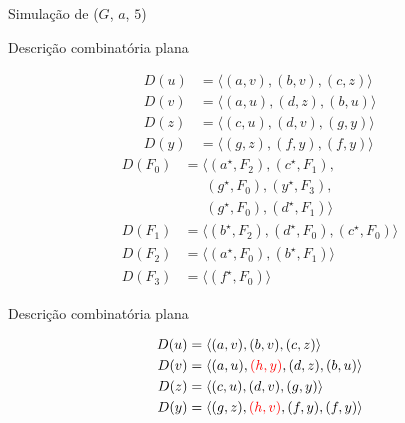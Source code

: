 \documentclass{IFES-beamer}
\newcommand{\red}{\color{red}}
\newcommand{\TODO}[1]{{{\red #1}}}
\newcommand{\AlgoName}[1]{\text{\scshape #1}}
\newcommand{\MSFupdate}{\AlgoName{mudaPesoGDP}} %
\begin{document}
\begin{frame}{Simulação de \MSFupdate($G$, $a$, $5$)}
\begin{figure}[htb]
\scalebox{1}{
\centering

}
\end{figure}
\end{frame}



\begin{frame}{Descrição combinatória plana}
\begin{minipage}[H]{0.1\textwidth}
\begin{align*}
D(u)&=\langle (a,v), (b,v), (c,z)\rangle\\
D(v)&=\langle (a,u), (d,z), (b,u)  \rangle\\
D(z)&=\langle (c,u), (d,v), (g,y) \rangle \\
D(y)&=\langle (g,z), (f,y), (f,y) \rangle
\end{align*}
\begin{align*}
D(F_0)&=\langle (a^\star, F_2), (c^\star, F_1), \\
      &~~~~~~~(g^\star, F_0), (y^\star, F_3), \\
      &~~~~~~~(g^\star, F_0), (d^\star, F_1)\rangle\\
D(F_1)&=\langle (b^\star, F_2), (d^\star, F_0), (c^\star, F_0)  \rangle\\
D(F_2)&=\langle (a^\star, F_0), (b^\star, F_1)\rangle \\
D(F_3)&=\langle (f^\star, F_0)\rangle
\end{align*}
\end{minipage}
\hspace{-1cm}
\begin{minipage}[H]{0.4\textwidth}
\begin{figure}[H]
\scalebox{1.2}{
\centering

}
\label{fig:MSF-basico-1}
\end{figure}
\end{minipage}
\end{frame}

\begin{frame}{Descrição combinatória plana}
\begin{minipage}[H]{0.4\textwidth}
\begin{align*}
D(u)&=\langle (a,v), (b,v), (c,z)\rangle\\
D(v)&=\langle (a,u),\TODO{(h,y)}, (d,z), (b,u)  \rangle\\
D(z)&=\langle (c,u), (d,v), (g,y) \rangle \\
D(y)&=\langle (g,z), \TODO{(h, v)}, (f,y), (f,y) \rangle
\end{align*}
\end{minipage}
\hspace{-1cm}
\begin{minipage}[H]{0.2\textwidth}
\begin{figure}[H]
\scalebox{1}{
\centering

}
\label{fig:MSF-basico-1}
\end{figure}
\end{minipage}
\end{frame}
\end{document}
